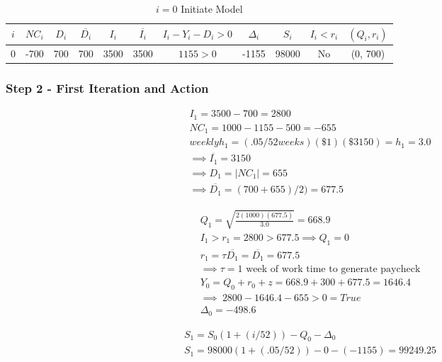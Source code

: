 \documentclass{article}
\begin{document}
\begin{table}
	\caption{$i = 0$ Initiate Model}
	\centering
	\begin{tabular}{||c|c|c|c|c|c|c|c|c|c|c||}
		\toprule
		$i$     & $NC_{i}$     & $D_{i}$ &  $\overline{D_{i}}$ & $I_{i}$ &  $\overline{I_{i}}$ & $I_{i}  - Y_{i} - D_{i} > 0$ & $\Delta_{i}$ & $S_{i}$ & $I_{i} < r_{i}$ & $(Q_{i}, r_{i})$\\
		\midrule
		0	& -700	&  700  	& 700  		& 3500	& 3500		& $1155 > 0$		 & -1155		& 98000 	&	No 	& (0, 700) \\
		\bottomrule
	\end{tabular}
	\label{tab:table}
\end{table}

\subsubsection{Step 2 - First Iteration and Action}

\begin{equation}
	\begin{split}
		I_{1} = 3500 - 700 = 2800\\
		NC_{1} = 1000 - 1155 - 500 = -655\\
		weekly h_{1} = (.05/52 weeks)(\$1)(\$3150) = h_{1} = 3.0\\
		\implies \overline{I_{1}} =  3150 \\
		\implies D_{1} = |NC_{1}|  = 655 \\
		\implies \overline{D_{1}} = (700+ 655)/2) = 677.5
	\end{split}
\end{equation}

\begin{equation}
	\begin{split}
		Q_{1} =  \sqrt{\frac{2(1000)(677.5)}{3.0}} = 668.9\\
		I_{1} > r_{1} = 2800 > 677.5 \implies Q_{1} = 0\\
		r_{1} =  \tau\overline{D_{1}} = \overline{D_{1}} = 677.5\\
		\implies \tau = \text{1 week of work time to generate paycheck}\\
		Y_{0} = Q_{0} + r_{0} + z = 668.9 + 300 + 677.5 = 1646.4\\
		\implies \: 2800 - 1646.4 - 655 > 0  = True \\
		\Delta_{0} = -498.6
	\end{split}
\end{equation}

\begin{equation}
	\begin{split}
		S_{1} =  S_{0}(1+(i/52)) - Q_{0} - \Delta_{0} \\
		S_{1} =  98000(1+(.05/52)) - 0 - (-1155) = 99249.25
	\end{split}
\end{equation}
\end{document}
